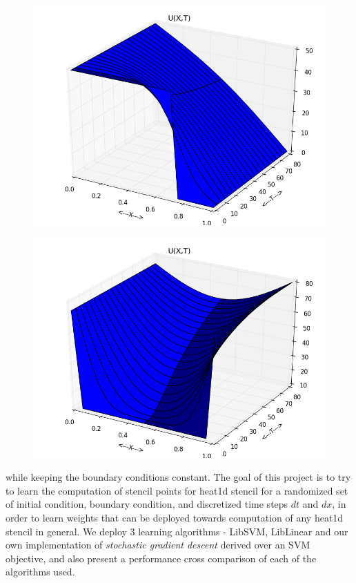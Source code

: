 \documentclass[letterpaper, 11 pt, conference]{ieeeconf}
\begin{document}
\begin{figure}
\includegraphics[scale=0.35]{plot_test_original_pwl_4.png}
\end{figure}

\begin{figure}
\includegraphics[scale=0.35]{plot_test_original_uni_4.png}
\end{figure}
while keeping the boundary conditions constant.
The goal of this project is to try to learn the computation of stencil points for heat1d stencil for a randomized set of initial condition, boundary condition, and discretized time steps $dt$ and $dx$, in order to learn weights that can be deployed towards computation of any heat1d stencil in general.  We deploy 3 learning algorithms - LibSVM, LibLinear and our own implementation of \textit{stochastic gradient descent} derived over an SVM objective, and also present a performance cross comparison of each of the algorithms used.
\end{document}
